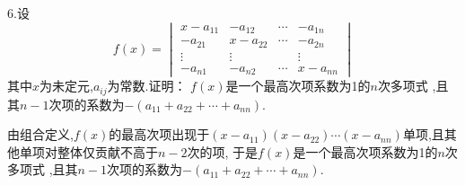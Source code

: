 6.设
\[
f\left(x\right)=\begin{vmatrix}
	x-a_{11}&-a_{12}&\cdots&-a_{1n}\\
	-a_{21}&x-a_{22}&\cdots&-a_{2n}\\
	\vdots&\vdots&&\vdots\\
	-a_{n1}&-a_{n2}&\cdots&x-a_{nn}
\end{vmatrix}
\]其中$x$为未定元,$a_{ij}$为常数.证明：
$f\left(x\right)$是一个最高次项系数为1的$n$次多项式
,且其$n-1$次项的系数为$-\left(a_{11}+a_{22}+\cdots+a_{nn}\right).$
\begin{Proof}
由组合定义,$f\left(x\right)$的最高次项出现于$\left(x-a_{11}\right)\left(x-a_{22}
\right)\cdots\left(x-a_{nn}\right)$单项,且其他单项对整体仅贡献不高于$n-2$次的项,
于是$f\left(x\right)$是一个最高次项系数为1的$n$次多项式
,且其$n-1$次项的系数为$-\left(a_{11}+a_{22}+\cdots+a_{nn}\right).$
\end{Proof}
